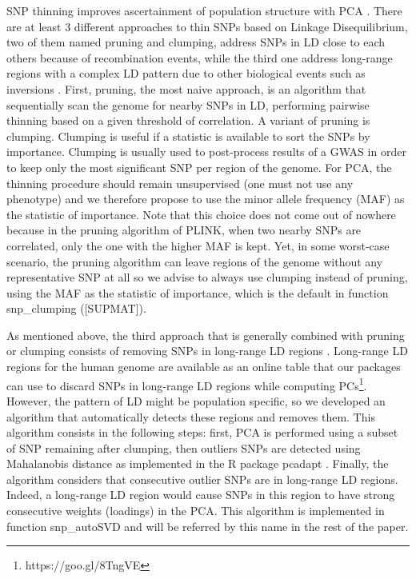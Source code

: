 \documentclass{bioinfo}
\begin{document}
\begin{methods}
SNP thinning improves ascertainment of population structure with PCA \cite[]{Abdellaoui2013}. There are at least 3 different approaches to thin SNPs based on Linkage Disequilibrium, two of them named pruning and clumping, address SNPs in LD close to each others because of recombination events, while the third one address long-range regions with a complex LD pattern due to other biological events such as inversions \cite[]{Price2008}. 
First, pruning, the most naive approach, is an algorithm that sequentially scan the genome for nearby SNPs in LD, performing pairwise thinning based on a given threshold of correlation.
A variant of pruning is clumping. 
{\color{red}
Clumping is useful if a statistic is available to sort the SNPs by importance. Clumping is usually used to post-process results of a GWAS in order to keep only the most significant SNP per region of the genome. For PCA, the thinning procedure should remain unsupervised (one must not use any phenotype) and we therefore propose to use the minor allele frequency (MAF) as the statistic of importance. Note that this choice does not come out of nowhere because in the pruning algorithm of PLINK, when two nearby SNPs are correlated, only the one with the higher MAF is kept. Yet, in some worst-case scenario, the pruning algorithm can leave regions of the genome without any representative SNP at all so we advise to always use clumping instead of pruning, using the MAF as the statistic of importance, which is the default in function snp\_clumping ([SUPMAT]).
}

As mentioned above, the third approach that is generally combined with pruning or clumping consists of removing SNPs in long-range LD regions \cite[]{Price2008}. Long-range LD regions for the human genome are available as an online table that our packages can use to discard SNPs in long-range LD regions while computing PCs\footnote{https://goo.gl/8TngVE}. 
However, the pattern of LD might be population specific, so we developed an algorithm that automatically detects these regions and removes them. This algorithm consists in the following steps: first, PCA is performed using a subset of SNP remaining after clumping, then outliers SNPs are detected using Mahalanobis distance as implemented in the R package pcadapt \cite[]{Luu2017}. Finally, the algorithm considers that consecutive outlier SNPs are in long-range LD regions. Indeed, a long-range LD region would cause SNPs in this region to have strong consecutive weights (loadings) in the PCA. This algorithm is implemented in function snp\_autoSVD and will be referred by this name in the rest of the paper.



\end{methods}
\end{document}
